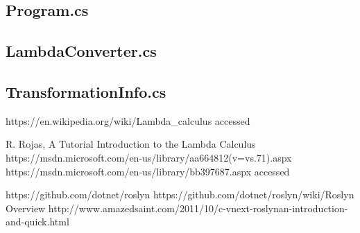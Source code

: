\documentclass[]{report}
\begin{document}
   \subsection{Program.cs}
    
    \pagebreak
    
    \subsection{LambdaConverter.cs}
    
    \pagebreak
    
    \subsection{TransformationInfo.cs}
    
    \pagebreak
 
                  
    
    
\begin{thebibliography}{80}
     https://en.wikipedia.org/wiki/Lambda\_calculus accessed \date{01.05.2017}
     R. Rojas, A Tutorial Introduction to the Lambda Calculus
     https://msdn.microsoft.com/en-us/library/aa664812(v=vs.71).aspx
     https://msdn.microsoft.com/en-us/library/bb397687.aspx
    accessed \date{01.05.2017}
     https://github.com/dotnet/roslyn
     https://github.com/dotnet/roslyn/wiki/Roslyn Overview
     http://www.amazedsaint.com/2011/10/c-vnext-roslynan-introduction-and-quick.html
    

\end{thebibliography}
\end{document}
